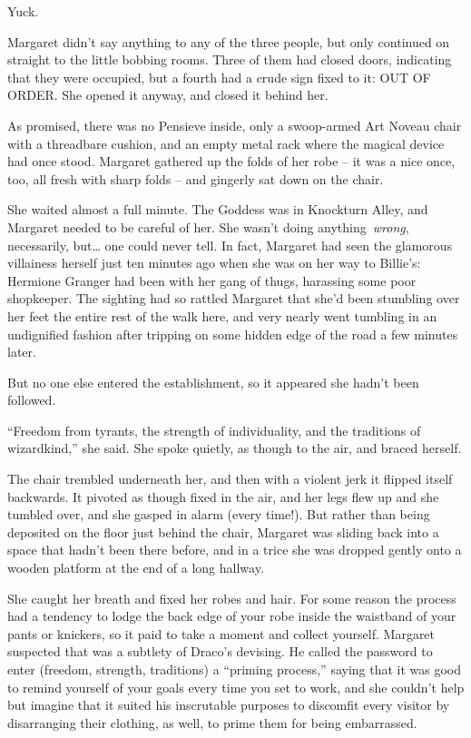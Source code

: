 Yuck.

Margaret didn't say anything to any of the three people, but only
continued on straight to the little bobbing rooms. Three of them had
closed doors, indicating that they were occupied, but a fourth had a
crude sign fixed to it: OUT OF ORDER. She opened it anyway, and closed
it behind her.

As promised, there was no Pensieve inside, only a swoop-armed Art Noveau
chair with a threadbare cushion, and an empty metal rack where the
magical device had once stood. Margaret gathered up the folds of her
robe -- it was a nice once, too, all fresh with sharp folds -- and
gingerly sat down on the chair.

She waited almost a full minute. The Goddess was in Knockturn Alley, and
Margaret needed to be careful of her. She wasn't doing
anything~\emph{wrong}, necessarily, but\ldots{} one could never tell. In
fact, Margaret had seen the glamorous villainess herself just ten
minutes ago when she was on her way to Billie's: Hermione Granger had
been with her gang of thugs, harassing some poor shopkeeper. The
sighting had so rattled Margaret that she'd been stumbling over her feet
the entire rest of the walk here, and very nearly went tumbling in an
undignified fashion after tripping on some hidden edge of the road a few
minutes later.

But no one else entered the establishment, so it appeared she hadn't
been followed.

``Freedom from tyrants, the strength of individuality, and the
traditions of wizardkind,'' she said. She spoke quietly, as though to
the air, and braced herself.

The chair trembled underneath her, and then with a violent jerk it
flipped itself backwards. It pivoted as though fixed in the air, and her
legs flew up and she tumbled over, and she gasped in alarm (every
time!). But rather than being deposited on the floor just behind the
chair, Margaret was sliding back into a space that hadn't been there
before, and in a trice she was dropped gently onto a wooden platform at
the end of a long hallway.

She caught her breath and fixed her robes and hair. For some reason the
process had a tendency to lodge the back edge of your robe inside the
waistband of your pants or knickers, so it paid to take a moment and
collect yourself. Margaret suspected that was a subtlety of Draco's
devising. He called the password to enter (freedom, strength,
traditions) a ``priming process,'' saying that it was good to remind
yourself of your goals every time you set to work, and she couldn't help
but imagine that it suited his inscrutable purposes to discomfit every
visitor by disarranging their clothing, as well, to prime them for being
embarrassed.

